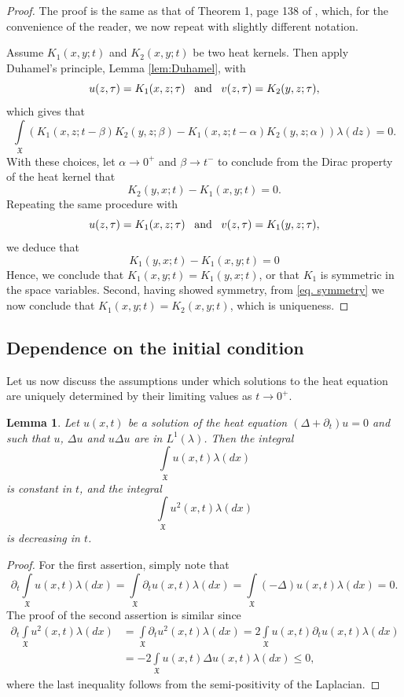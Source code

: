 \documentclass[11pt,reqno]{amsart}
\newtheorem{lemma}[theorem]{Lemma}
\theoremstyle{remark}
\theoremstyle{definition}
\numberwithin{theorem}{section} \numberwithin{equation}{section}
\newcommand{\X}{\mathfrak{X}}
\begin{document}
\begin{proof}
The proof is the same as that of Theorem 1, page 138 of \cite{Ch84}, which, for the convenience
of the reader, we now repeat with slightly different notation.

Assume $K_{1}(x,y;t)$ and $K_{2}(x,y;t)$ be two heat kernels.  Then apply Duhamel's principle,
Lemma \ref{lem:Duhamel}, with
$$
u(z,\tau) = K_{1}(x,z;\tau)
\,\,\,\,\,
\text{\rm and}
\,\,\,\,\,
v(z,\tau) = K_{2}(y,z;\tau),
$$
which gives that
$$
\int\limits_{\X}\left(K_{1}(x,z;t-\beta)K_{2}(y,z;\beta) - K_{1}(x,z;t-\alpha)K_{2}(y,z;\alpha)\right)\lambda(dz) = 0.
$$
With these choices, let $\alpha \rightarrow 0^{+}$ and $\beta \rightarrow t^{-}$ to conclude from the Dirac property of the heat kernel that
\begin{equation}\label{eq. symmetry}
K_{2}(y,x;t) - K_{1}(x,y;t)=0.
\end{equation}
Repeating the same procedure with
$$
u(z,\tau) = K_{1}(x,z;\tau)
\,\,\,\,\,
\text{\rm and}
\,\,\,\,\,
v(z,\tau) = K_{1}(y,z;\tau),
$$
we deduce that
$$
K_{1}(y,x;t) - K_{1}(x,y;t)=0
$$
Hence, we conclude that $K_{1}(x,y;t)=K_{1}(y,x;t)$, or that $K_{1}$ is symmetric in the space variables.  Second, having showed symmetry, from \eqref{eq. symmetry} we now conclude that $K_{1}(x,y;t) = K_{2}(x,y;t)$, which is uniqueness.
\end{proof}

\subsection{Dependence on the initial condition} Let us now discuss the assumptions under which solutions to the heat equation are uniquely determined by their limiting values as $t\rightarrow 0^{+}$.

\begin{lemma} \label{lem:time_dependence}
Let $u(x,t)$ be a solution of the heat equation $(\Delta+\partial_t)u=0$ and such that $u$, $\Delta u$ and $u\Delta u$ are in $L^1(\lambda)$.  Then
the integral
$$
\int\limits_{\X}u(x,t)\lambda(dx)
$$
is constant in $t$, and the integral
$$
\int\limits_{\X}u^{2}(x,t)\lambda(dx)
$$
is decreasing in $t$.
\end{lemma}

\begin{proof}
For the first assertion, simply note that
$$
\partial_{t}\int\limits_{\X}u(x,t)\lambda(dx) = \int\limits_{\X}\partial_{t}u(x,t)\lambda(dx)
= \int\limits_{\X}(-\Delta) u(x,t)\lambda(dx) =0.
$$
The proof of the second assertion is similar since
\begin{align*}
\partial_{t}\int\limits_{\X}u^2(x,t)\lambda(dx) &= \int\limits_{\X}\partial_{t}u^2(x,t)\lambda(dx)
= 2\int\limits_{\X}u(x,t)\partial_{t}u(x,t)\lambda(dx)
\\&= -2\int\limits_{\X}u(x,t)\Delta u(x,t)\lambda(dx) \leq 0,
\end{align*}
where the last inequality follows from the semi-positivity of the Laplacian.
\end{proof}
\end{document}
